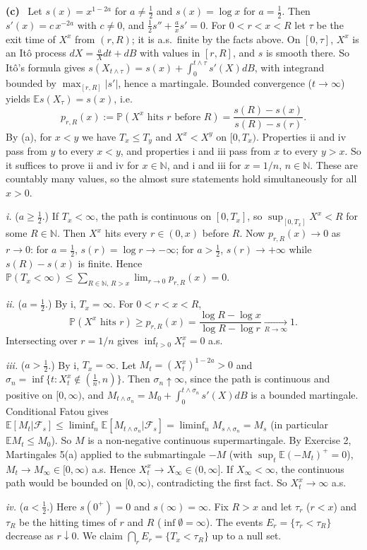 \documentclass[11pt,a4paper]{article}
\newcommand{\E}{\mathbb{E}}
\renewcommand{\P}{\mathbb{P}}
\newcommand{\N}{\mathbb{N}}
\newcommand{\F}{\mathcal{F}}
\newcommand{\1}{\mathbf{1}}
\newcommand{\sub}[1]{\par\smallskip\noindent\textbf{#1}\ }
\begin{document}
\sub{(c)} Let $s(x)=x^{1-2a}$ for $a\ne\frac12$ and $s(x)=\log x$ for $a=\frac12$. Then $s'(x)=c\,x^{-2a}$ with $c\neq0$,
and $\frac12s''+\frac ax s'=0$. For $0<r<x<R$ let $\tau$ be the exit time of $X^x$ from $(r,R)$; it is a.s.\ finite by
the facts above. On $[0,\tau]$, $X^x$ is an Itô process $dX=\frac aXdt+dB$ with values in $[r,R]$, and $s$ is smooth
there. So Itô's formula gives $s(X_{t\wedge\tau})=s(x)+\int_0^{t\wedge\tau}s'(X)dB$, with integrand bounded by
$\max_{[r,R]}|s'|$, hence a martingale. Bounded convergence ($t\to\infty$) yields $\E s(X_\tau)=s(x)$, i.e.\
\[
p_{r,R}(x):=\P(X^x\text{ hits }r\text{ before }R)=\frac{s(R)-s(x)}{s(R)-s(r)} .
\]
By (a), for $x<y$ we have $T_x\le T_y$ and $X^x<X^y$ on $[0,T_x)$. Properties ii and iv pass from $y$ to every $x<y$,
and properties i and iii pass from $x$ to every $y>x$. So it suffices to prove ii and iv for $x\in\N$, and i and iii for
$x=1/n$, $n\in\N$. These are countably many values, so the almost sure statements hold simultaneously for all $x>0$.

\emph{i.} ($a\ge\frac12$.) If $T_x<\infty$, the path is continuous on $[0,T_x]$, so $\sup_{[0,T_x]}X^x<R$ for some
$R\in\N$. Then $X^x$ hits every $r\in(0,x)$ before $R$. Now $p_{r,R}(x)\to0$ as $r\to0$: for $a=\frac12$,
$s(r)=\log r\to-\infty$; for $a>\frac12$, $s(r)\to+\infty$ while $s(R)-s(x)$ is finite. Hence
$\P(T_x<\infty)\le\sum_{R\in\N,\,R>x}\lim_{r\to0}p_{r,R}(x)=0$.

\emph{ii.} ($a=\frac12$.) By i, $T_x=\infty$. For $0<r<x<R$,
\[\P(X^x\text{ hits }r)\ge p_{r,R}(x)=\frac{\log R-\log x}{\log R-\log r}\xrightarrow[R\to\infty]{}1.\]
Intersecting over $r=1/n$ gives $\inf_{t>0}X^x_t=0$ a.s.

\emph{iii.} ($a>\frac12$.) By i, $T_x=\infty$. Let $M_t=(X^x_t)^{1-2a}>0$ and
$\sigma_n=\inf\{t:X^x_t\notin(\frac1n,n)\}$. Then $\sigma_n\uparrow\infty$, since the path is continuous and positive on
$[0,\infty)$, and $M_{t\wedge\sigma_n}=M_0+\int_0^{t\wedge\sigma_n}s'(X)dB$ is a bounded martingale. Conditional Fatou
gives $\E[M_t|\F_s]\le\liminf_n\E[M_{t\wedge\sigma_n}|\F_s]=\liminf_nM_{s\wedge\sigma_n}=M_s$ (in particular
$\E M_t\le M_0$). So $M$ is a non-negative continuous supermartingale. By Exercise 2, Martingales 5(a) applied to the
submartingale $-M$ (with $\sup_t\E(-M_t)^+=0$), $M_t\to M_\infty\in[0,\infty)$ a.s. Hence $X^x_t\to X_\infty\in(0,\infty]$.
If $X_\infty<\infty$, the continuous path would be bounded on $[0,\infty)$, contradicting the first fact. So
$X^x_t\to\infty$ a.s.

\emph{iv.} ($a<\frac12$.) Here $s(0^+)=0$ and $s(\infty)=\infty$. Fix $R>x$ and let $\tau_r$ ($r<x$) and $\tau_R$ be
the hitting times of $r$ and $R$ ($\inf\emptyset=\infty$). The events $E_r=\{\tau_r<\tau_R\}$ decrease as
$r\downarrow0$. We claim $\bigcap_{r}E_r=\{T_x<\tau_R\}$ up to a null set.
\end{document}
